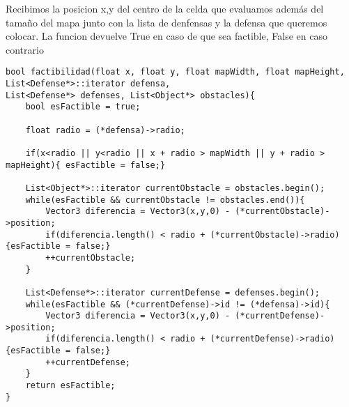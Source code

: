 
Recibimos la posicion x,y del centro de la celda que evaluamos además del tamaño del mapa junto con la lista de denfensas y la defensa que queremos colocar.
La funcion devuelve True en caso de que sea factible, False en caso contrario

\begin{lstlisting}
bool factibilidad(float x, float y, float mapWidth, float mapHeight, List<Defense*>::iterator defensa,
List<Defense*> defenses, List<Object*> obstacles){
	bool esFactible = true;
	
	float radio = (*defensa)->radio;

	if(x<radio || y<radio || x + radio > mapWidth || y + radio > mapHeight){ esFactible = false;}

	List<Object*>::iterator currentObstacle = obstacles.begin();
	while(esFactible && currentObstacle != obstacles.end()){
		Vector3 diferencia = Vector3(x,y,0) - (*currentObstacle)->position;
		if(diferencia.length() < radio + (*currentObstacle)->radio) {esFactible = false;}
		++currentObstacle;
	}

	List<Defense*>::iterator currentDefense = defenses.begin();
	while(esFactible && (*currentDefense)->id != (*defensa)->id){
		Vector3 diferencia = Vector3(x,y,0) - (*currentDefense)->position;
		if(diferencia.length() < radio + (*currentDefense)->radio) {esFactible = false;}
		++currentDefense;
	}
	return esFactible;
}
\end{lstlisting}



